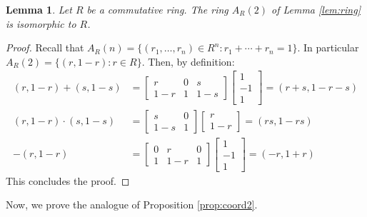 \documentclass{amsart}
\numberwithin{equation}{section}
\theoremstyle{plain}
\newtheorem{lemma}[theorem]{Lemma}
\theoremstyle{definition}
\begin{document}
\begin{lemma}
  \label{lem:unit}
  Let $R$ be a commutative ring. 
  The ring $A_R(2)$ of Lemma \ref{lem:ring} 
  is isomorphic to $R$. 
\end{lemma}
\begin{proof}
    Recall that $A_R(n)=\{(r_1, \ldots, r_n) \in R^n : r_1 + \cdots +r_n =1\}$. 
    In particular $A_R(2) =\{(r,1-r) : r \in R\}$. 
    Then, by definition: 
    \begin{align*}
      (r,1-r) + (s,1-s) & = 
      \begin{bmatrix}
      r & 0 & s\\
      1-r & 1 & 1-s
      \end{bmatrix} 
      \begin{bmatrix}
      1 \\
      -1 \\
      1
      \end{bmatrix} = 
      (r+s, 1-r-s) \\
      (r,1-r) \cdot (s,1-s) & = 
      \begin{bmatrix}
      s & 0 \\
      1-s & 1 
      \end{bmatrix} 
      \begin{bmatrix}
      r \\
      1-r 
      \end{bmatrix} = 
      (rs, 1-rs) \\
      -(r,1-r) & = 
      \begin{bmatrix}
      0 & r & 0\\
      1 & 1-r & 1
      \end{bmatrix} 
      \begin{bmatrix}
      1 \\
      -1 \\
      1
      \end{bmatrix} = 
      (-r, 1+r) 
    \end{align*}
    This concludes the proof. 
\end{proof}

Now, we prove the analogue of Proposition \ref{prop:coord2}.
\end{document}
